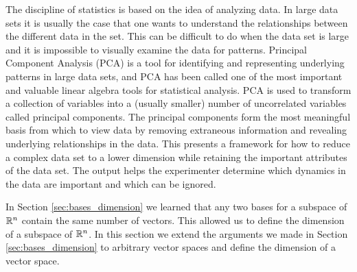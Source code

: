  \label{sec:dimension}

\vspace*{-17 pt}
 
\vspace*{13 pt}


The discipline of statistics is based on the idea of analyzing data. In large data sets it is usually the case that one wants to understand the relationships between the different data in the set. This can be difficult to do when the data set is large and it is impossible to visually examine the data for patterns. Principal Component Analysis (PCA) is a tool for identifying and representing underlying patterns in large data sets, and PCA has been called one of the most important and valuable linear algebra tools for statistical analysis. PCA is used to transform a collection of variables into a (usually smaller) number of uncorrelated variables called principal components. The principal components form the most meaningful basis from which to view data by removing extraneous information and revealing underlying relationships in the data. This presents a framework for how to reduce a complex data set to a lower dimension while retaining the important attributes of the data set.  The output helps the experimenter determine which dynamics in the data are important and which can be ignored. 


In Section \ref{sec:bases_dimension} we learned that any two bases for a subspace of $\mathbb{R}^n$ contain the same number of vectors. This allowed us to define the dimension of a subspace of $\mathbb{R}^n$. In this section we extend the arguments we made in Section \ref{sec:bases_dimension} to arbitrary vector spaces and define the dimension of a vector space. 

